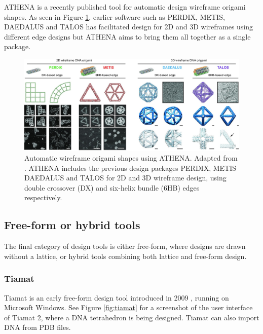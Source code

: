  ATHENA is a recently published tool for automatic design wireframe origami shapes. As seen in Figure \ref{fig:athena}, earlier software such as PERDIX, METIS, DAEDALUS and TALOS has facilitated design for 2D and 3D wireframes using different edge designs but ATHENA aims to bring them all together as a single package.


\begin{figure}[h]
  \begin{center}
    \includegraphics[width=\textwidth]{figures/athena.jpeg}
    \caption{Automatic wireframe origami shapes using ATHENA. Adapted from \cite{athena}. ATHENA includes the previous design packages PERDIX, METIS DAEDALUS and TALOS for 2D and 3D wireframe design, using double crossover (DX) and six-helix bundle (6HB) edges respectively. }
    \label{fig:athena}
  \end{center}
\end{figure}


\subsection{Free-form or hybrid tools}
The final category of design tools is either free-form, where designs are drawn without a lattice, or hybrid tools combining both lattice and free-form design. 

\subsubsection{Tiamat}
Tiamat is an early free-form design tool introduced in 2009 \cite{Tiamat}, running on Microsoft Windows. See Figure \ref{fig:tiamat} for a screenshot of the user interface of Tiamat 2, where a DNA tetrahedron is being designed. Tiamat can also import DNA from PDB files.

